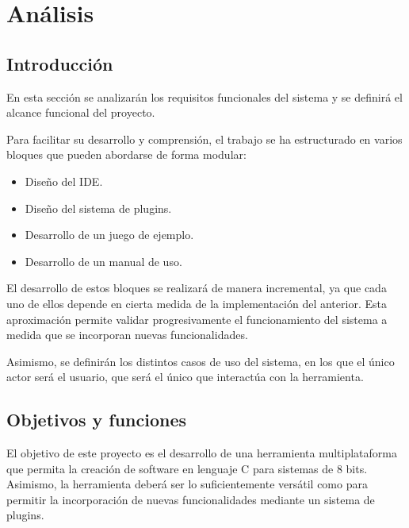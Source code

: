 \documentclass[../../main.tex]{subfiles}
\begin{document}
\chapter{Análisis}
\label{C:analisis}

\section{Introducción}
\label{S:introduccion}

\par{En esta sección se analizarán los requisitos funcionales del sistema y se definirá el alcance funcional del proyecto.}

\par{Para facilitar su desarrollo y comprensión, el trabajo se ha estructurado en varios bloques que pueden abordarse de forma modular:}

\begin{itemize}
    \item Diseño del IDE. 
    \item Diseño del sistema de plugins.
    \item Desarrollo de un juego de ejemplo.
    \item Desarrollo de un manual de uso.
\end{itemize}

\par{El desarrollo de estos bloques se realizará de manera incremental, ya que cada uno de ellos depende en cierta medida de la implementación del anterior. Esta aproximación permite validar progresivamente el funcionamiento del sistema a medida que se incorporan nuevas funcionalidades.}

\par{Asimismo, se definirán los distintos casos de uso del sistema, en los que el único actor será el usuario, que será el único que interactúa con la herramienta.}

\clearpage

\section{Objetivos y funciones}
\label{S:objetivos_analisis}

\par{El objetivo de este proyecto es el desarrollo de una herramienta multiplataforma que permita la creación de software en lenguaje C para sistemas de 8 bits. Asimismo, la herramienta deberá ser lo suficientemente versátil como para permitir la incorporación de nuevas funcionalidades mediante un sistema de plugins.}
\end{document}
